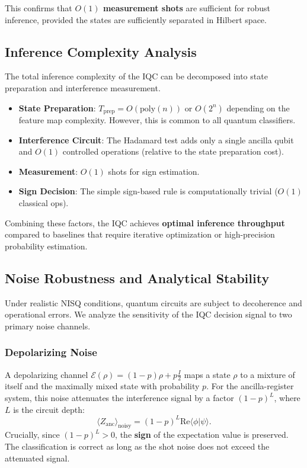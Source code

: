 \documentclass[conference]{IEEEtran}
\begin{document}
This confirms that \textbf{$O(1)$ measurement shots} are sufficient for robust inference, provided the states are sufficiently separated in Hilbert space.

\subsection{Inference Complexity Analysis}

The total inference complexity of the IQC can be decomposed into state preparation and interference measurement.
\begin{itemize}
    \item \textbf{State Preparation}: $T_{\text{prep}} = O(\text{poly}(n))$ or $O(2^n)$ depending on the feature map complexity. However, this is common to all quantum classifiers.
    \item \textbf{Interference Circuit}: The Hadamard test adds only a single ancilla qubit and $O(1)$ controlled operations (relative to the state preparation cost).
    \item \textbf{Measurement}: $O(1)$ shots for sign estimation.
    \item \textbf{Sign Decision}: The simple sign-based rule is computationally trivial ($O(1)$ classical ops).
\end{itemize}
Combining these factors, the IQC achieves \textbf{optimal inference throughput} compared to baselines that require iterative optimization or high-precision probability estimation.

\subsection{Noise Robustness and Analytical Stability}

Under realistic NISQ conditions, quantum circuits are subject to decoherence and operational errors. We analyze the sensitivity of the IQC decision signal to two primary noise channels.

\subsubsection{Depolarizing Noise}
A depolarizing channel $\mathcal{E}(\rho) = (1-p)\rho + p\frac{I}{2}$ maps a state $\rho$ to a mixture of itself and the maximally mixed state with probability $p$. For the ancilla-register system, this noise attenuates the interference signal by a factor $(1-p)^L$, where $L$ is the circuit depth:
\begin{equation}
    \langle Z_{\text{anc}} \rangle_{\text{noisy}} = (1-p)^L \mathrm{Re}\langle \phi | \psi \rangle.
\end{equation}
Crucially, since $(1-p)^L > 0$, the \textbf{sign} of the expectation value is preserved. The classification is correct as long as the shot noise does not exceed the attenuated signal.
\end{document}
